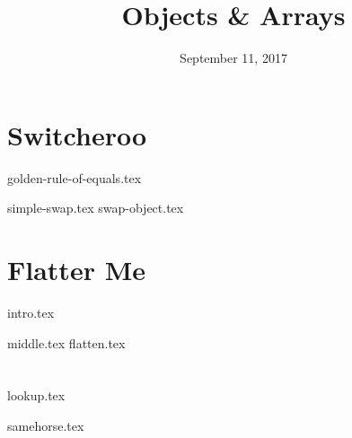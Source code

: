\documentclass[11pt]{exam}
\title{Objects \& Arrays}
\date{September 11, 2017}
\begin{document}
\maketitle

\section{Switcheroo}
{golden-rule-of-equals.tex}
\begin{questions}
{simple-swap.tex}
{swap-object.tex}
\end{questions}

\section{Flatter Me}
{intro.tex}
\begin{questions}
{middle.tex}
{flatten.tex}
\end{questions}

\section{}
{lookup.tex}
\begin{questions}
{samehorse.tex}
\end{questions}
\end{document}
